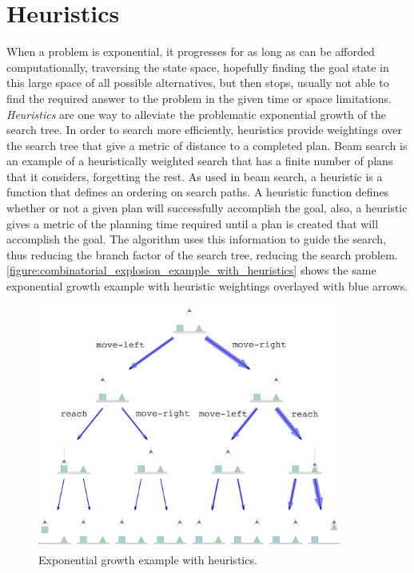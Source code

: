 \section{Heuristics}

When a problem is exponential, it progresses for as long as can be
afforded computationally, traversing the state space, hopefully
finding the goal state in this large space of all possible
alternatives, but then stops, usually not able to find the required
answer to the problem in the given time or space limitations.
\emph{Heuristics} are one way to alleviate the problematic exponential
growth of the search tree.  In order to search more efficiently,
heuristics provide weightings over the search tree that give a metric
of distance to a completed plan.  Beam search is an example of a
heuristically weighted search that has a finite number of plans that
it considers, forgetting the rest.  As used in beam search, a
heuristic is a function that defines an ordering on search paths.  A
heuristic function defines whether or not a given plan will
successfully accomplish the goal, also, a heuristic gives a metric of
the planning time required until a plan is created that will
accomplish the goal.  The algorithm uses this information to guide the
search, thus reducing the branch factor of the search tree, reducing
the search problem.
{\mbox{\autoref{figure:combinatorial_explosion_example_with_heuristics}}}
shows the same exponential growth example with heuristic weightings
overlayed with blue arrows.
\begin{figure}
\center
\includegraphics[width=10cm]{gfx/combinatorial_explosion_example_with_heuristics}
\caption{Exponential growth example with heuristics.}
\label{figure:combinatorial_explosion_example_with_heuristics}
\end{figure}

